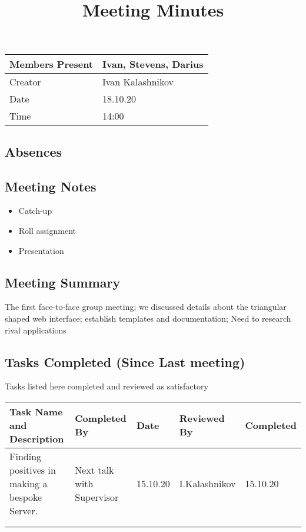 \documentclass{article}
\title{Meeting Minutes}
\date{}
\begin{document}
\maketitle

\begin{center}
    \begin{tabular}{ | l | p{14cm} |}
    \hline
    Members Present & Ivan, Stevens, Darius\\ \hline
    Creator         & Ivan Kalashnikov\\ \hline
    Date            & 18.10.20 \\ \hline
    Time            & 14:00\\ \hline
    \end{tabular}
\end{center}

\subsection{Absences}

\subsection{Meeting Notes}
\begin{itemize}
    \item Catch-up
    \item Roll assignment
    \item Presentation
\end{itemize}

\subsection{Meeting Summary}

The first face-to-face group meeting; we discussed details about the triangular shaped web interface; establish templates and documentation; Need to research rival applications 

\subsection{Tasks Completed (Since Last meeting)}
Tasks listed here completed and reviewed as satisfactory
\begin{center}
    \begin{tabular}{|p{9cm}|l|l|l|l|}
    \hline
    Task Name and Description & Completed By & Date & Reviewed By & Completed \\ \hline
    Finding positives in making a bespoke Server.  & Next talk with Supervisor &  15.10.20   & I.Kalashnikov & 15.10.20\\ \hline
                              &              &      &             &           \\ \hline
                              &              &      &             &           \\ \hline
    \end{tabular}
    \end{center}
\end{document}
